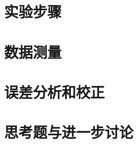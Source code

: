 \documentclass{article} %
\begin{document}
\section {实验步骤}



\section {数据测量}


\section{误差分析和校正}



\section {思考题与进一步讨论}
\end{document}
